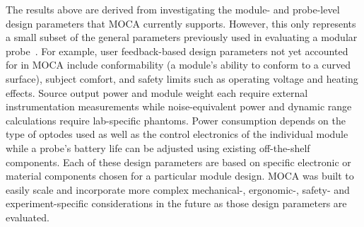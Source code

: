 {%
The results above are derived from investigating the module- and probe-level design parameters that \ac{MOCA} currently supports. However, this only represents a small subset of the general parameters previously used in evaluating a modular probe~\cite{Zhao2017}. For example, user feedback-based design parameters not yet accounted for in \ac{MOCA} include conformability (a module's ability to conform to a curved surface), subject comfort, and safety limits such as operating voltage and heating effects. Source output power and module weight each require external instrumentation measurements while noise-equivalent power and dynamic range calculations require lab-specific phantoms. Power consumption depends on the type of optodes used as well as the control electronics of the individual module while a probe's battery life can be adjusted using existing off-the-shelf components. Each of these design parameters are based on specific electronic or material components chosen for a particular module design. \ac{MOCA} was built to easily scale and incorporate more complex mechanical-, ergonomic-, safety- and experiment-specific considerations in the future as those design parameters are evaluated.

}
